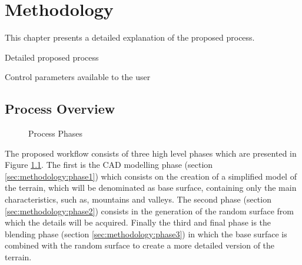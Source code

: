 \chapter{Methodology} \label{chap:methodology}

This chapter presents a detailed explanation of the proposed process. 



\begin{notes}
	\item Detailed proposed process
	\item Control parameters available to the user
\end{notes}

\section{Process Overview}

\begin{figure}[h!]
	\begin{center}
	\end{center}
	
	\caption{Process Phases}
	\label{fig:process_phases}
\end{figure}

The proposed workflow consists of three high level phases which are presented in Figure \ref{fig:process_phases}. The first is the CAD modelling phase (section \ref{sec:methodology:phase1}) which consists on the creation of a simplified model of the terrain, which will be denominated as base surface, containing only the main characteristics, such as, mountains and valleys. The second phase (section \ref{sec:methodology:phase2}) consists in the generation of the random surface from which the details will be acquired. Finally the third and final phase is the blending phase (section \ref{sec:methodology:phase3}) in which the base surface is combined with the random surface to create a more detailed version of the terrain.

